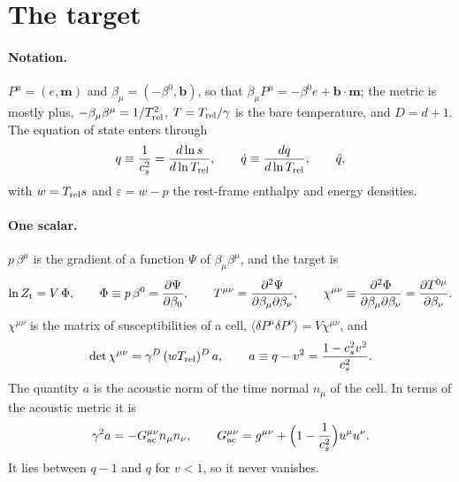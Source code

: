 \documentclass[11pt,aps,preprint,nofootinbib,superscriptaddress,tightenlines]{revtex4-2}
\newcommand{\avg}[1]{\langle #1\rangle}
\def\st{\begin{equation}}
\def\stp{\end{equation}}
\let\oldparagraph\paragraph
\renewcommand{\paragraph}{\par\bigskip\oldparagraph}
\begin{document}
\section{The target}
\label{sec:target}

\paragraph{Notation.}  $P^\mu=(e,\bm m)$ and $\beta_\mu=(-\beta^0,\bm b)$, so that $\beta_\mu P^\mu=-\beta^0e+\bm b\cdot\bm m$; the metric is mostly
plus, $-\beta_\mu\beta^\mu=1/T_{\rm rel}^2$, $T=T_{\rm rel}/\gamma$ is the bare temperature, and $D=d+1$.  The equation of state enters through
\st
q\equiv\frac1{c_s^2}=\frac{d\ln s}{d\ln T_{\rm rel}},\qquad \dot q\equiv\frac{dq}{d\ln T_{\rm rel}},\qquad \ddot q ,
\stp
with $w=T_{\rm rel}s$ and $\varepsilon=w-p$ the rest-frame enthalpy and energy densities.

\paragraph{One scalar.}  $p\,\beta^\mu$ is the gradient of a function $\Psi$ of $\beta_\mu\beta^\mu$, and the target is
\st
\ln Z_{\rm t}=V\,\Phi,\qquad \Phi\equiv p\,\beta^0=\frac{\partial\Psi}{\partial\beta_0},\qquad
T^{\mu\nu}=\frac{\partial^2\Psi}{\partial\beta_\mu\partial\beta_\nu},\qquad
\chi^{\mu\nu}\equiv\frac{\partial^2\Phi}{\partial\beta_\mu\partial\beta_\nu}=\frac{\partial T^{0\mu}}{\partial\beta_\nu} .
\stp
$\chi^{\mu\nu}$ is the matrix of susceptibilities of a cell, $\avg{\delta P^\mu\delta P^\nu}=V\chi^{\mu\nu}$, and
\st
\det\chi^{\mu\nu}=\gamma^{D}\,(wT_{\rm rel})^{D}\,a,\qquad a\equiv q-v^2=\frac{1-c_s^2v^2}{c_s^2} .
\label{det}
\stp
The quantity $a$ is the acoustic norm of the time normal $n_\mu$ of the cell.  In terms of the acoustic metric it is
\st
\gamma^2a=-G_{\rm ac}^{\mu\nu}n_\mu n_\nu,\qquad G_{\rm ac}^{\mu\nu}=g^{\mu\nu}+\Big(1-\frac1{c_s^2}\Big)u^\mu u^\nu .
\stp
It lies between $q-1$ and $q$ for $v<1$, so
it never vanishes.
\end{document}
